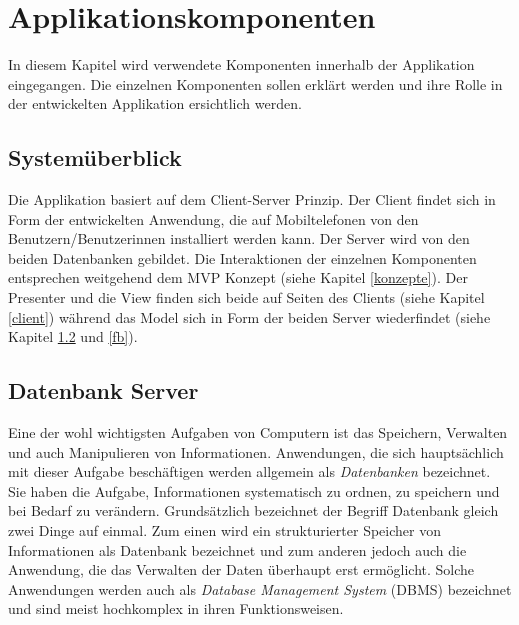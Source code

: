 \documentclass[a4paper,11pt]{report}
\begin{document}
	\chapter{Applikationskomponenten}
	In diesem Kapitel wird verwendete Komponenten innerhalb der Applikation eingegangen. Die einzelnen Komponenten sollen erklärt werden und ihre Rolle in der entwickelten Applikation ersichtlich werden.
		\section{Systemüberblick}
		Die Applikation basiert auf dem Client-Server Prinzip. Der Client findet sich in Form der entwickelten Anwendung, die auf Mobiltelefonen von den Benutzern/Benutzerinnen installiert werden kann. Der Server wird von den beiden Datenbanken gebildet. Die Interaktionen der einzelnen Komponenten entsprechen weitgehend dem MVP Konzept (siehe Kapitel \ref{konzepte}). Der Presenter und die View finden sich beide auf Seiten des Clients (siehe Kapitel \ref{client}) während das Model sich in Form der beiden Server wiederfindet (siehe Kapitel \ref{server} und \ref{fb}).
		
			\section{Datenbank Server} \label{server}
			Eine der wohl wichtigsten Aufgaben von Computern ist das Speichern, Verwalten und auch Manipulieren von Informationen. Anwendungen, die sich hauptsächlich mit dieser Aufgabe beschäftigen werden allgemein als \emph{Datenbanken} bezeichnet. Sie haben die Aufgabe, Informationen systematisch zu ordnen, zu speichern und bei Bedarf zu verändern. Grundsätzlich bezeichnet der Begriff Datenbank gleich zwei Dinge auf einmal. Zum einen wird ein strukturierter Speicher von Informationen als Datenbank bezeichnet und zum anderen jedoch auch die Anwendung, die das Verwalten der Daten überhaupt erst ermöglicht. Solche Anwendungen werden auch als \emph{Database Management System} (DBMS) bezeichnet und sind meist hochkomplex in ihren Funktionsweisen. \cite{IT-Handbuch}
			
\end{document}
